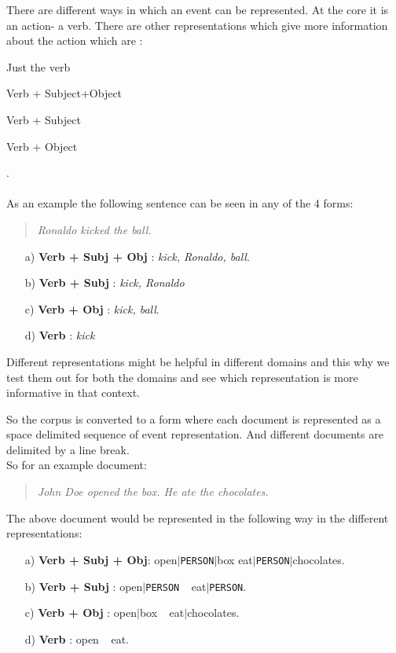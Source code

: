 \documentclass[12pt]{article}
\begin{document}
There are different ways in which an event can be represented. At the core it is an action- a verb. There are other representations which give more information about the action which are : 
\begin{enumerate*}[label=\itshape\alph*\upshape)]
	\item Just the verb
	\item Verb + Subject+Object
	\item Verb + Subject
	\item Verb + Object
\end{enumerate*}. \\ 
\\
As an example the following sentence can be seen in any of the 4 forms:
\begin{quote}
	\textit{Ronaldo kicked the ball.}
\end{quote}
\begin{enumerate}
	\item[a)] \textbf{Verb + Subj + Obj} : \textit{kick, Ronaldo, ball}.
	\item[b)] \textbf{Verb + Subj} : \textit{kick, Ronaldo}
	\item[c)] \textbf{Verb + Obj} : \textit{kick, ball}.
	\item[d)] \textbf{Verb} : \textit{kick}
\end{enumerate}

Different representations might be helpful in different domains and this why we test them out for both the domains and see which representation is more informative in that context.

So the corpus is converted to a form where each document is represented as a space delimited sequence of event representation. And different documents are delimited by a line break. \\
So for an example document:
\begin{quote}
	\textit{John Doe opened the box. He ate the chocolates.}
\end{quote}
The above document would be represented in the following way in the different representations:
\begin{enumerate}
	\item[a)] \textbf{Verb + Subj + Obj}: open$|$\texttt{PERSON}$|$box eat$|$\texttt{PERSON}$|$chocolates.
	\item[b)] \textbf{Verb + Subj} : open$|$\texttt{PERSON} $\ \ $ eat$|$\texttt{PERSON}.
	\item[c)] \textbf{Verb + Obj} : open$|$box $\ \ $ eat$|$chocolates.
	\item[d)] \textbf{Verb} : open $\ \ $ eat.
\end{enumerate}
\end{document}
